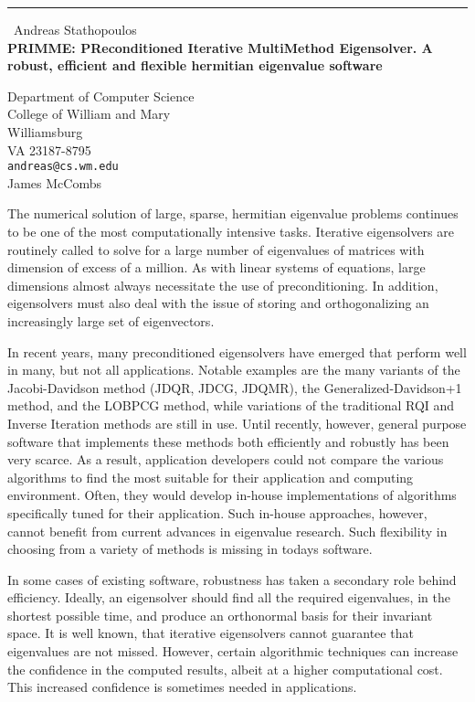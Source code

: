 \documentclass{report}
\begin{document}
\begin{center}
\rule{6in}{1pt} \
{\large Andreas Stathopoulos \\
{\bf PRIMME: PReconditioned Iterative MultiMethod Eigensolver. A robust, efficient and flexible hermitian eigenvalue software}}

Department of Computer Science \\ College of William and Mary \\ Williamsburg \\ VA 23187-8795
\\
{\tt andreas@cs.wm.edu}\\
James McCombs\end{center}

\small
The numerical solution of large, sparse, hermitian eigenvalue problems
continues to be one of the most computationally intensive tasks.
Iterative eigensolvers are routinely called to solve for a large number
of eigenvalues of matrices with dimension of excess of a million.
As with linear systems of equations, large dimensions almost always
necessitate the use of preconditioning. In addition, eigensolvers must
also deal with the issue of storing and orthogonalizing an increasingly
large set of eigenvectors.

In recent years, many preconditioned eigensolvers have emerged that
perform well in many, but not all applications. Notable examples are the
many variants of the Jacobi-Davidson method (JDQR, JDCG, JDQMR), the
Generalized-Davidson+1 method, and the LOBPCG method, while variations
of the traditional RQI and Inverse Iteration methods are still in use.
Until recently, however, general purpose software that implements these
methods both efficiently and robustly has been very scarce.
As a result, application developers
could not compare the various algorithms to find the most suitable for
their application and computing environment. Often, they would develop
in-house implementations of algorithms specifically tuned for their
application. Such in-house approaches, however, cannot benefit from
current advances in eigenvalue research. Such flexibility in choosing
from a variety of methods is missing in todays software.

In some cases of existing software, robustness has taken a secondary
role behind efficiency. Ideally, an eigensolver should find all the
required eigenvalues, in the shortest possible time, and produce an
orthonormal basis for their invariant space. It is well known, that
iterative eigensolvers cannot guarantee that eigenvalues are not missed.
However, certain algorithmic techniques can increase the confidence in
the computed results, albeit at a higher computational cost. This
increased confidence is sometimes needed in applications.
\end{document}
